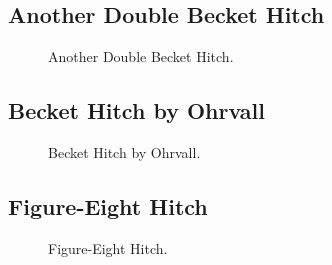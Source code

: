 
\subsection{Another Double Becket Hitch}


\begin{figure}[H]\centering
\end{figure}
\begin{figure}[H]\centering
	\caption{Another Double Becket Hitch.}\label{ris:Another_Double_Becket_Hitch}
\end{figure}

\subsection{Becket Hitch by Ohrvall}

\begin{figure}[H]\centering
	\begin{minipage}{1\linewidth}
		\begin{center}
			\tcbox[enhanced jigsaw,colframe=black,opacityframe=0.5,opacityback=0.5]
			{\centering{}}
		\end{center}
	\end{minipage}
\caption{Becket Hitch by Ohrvall.}
\label{ris:Becket_Hitch_by_Ohrvall}
\end{figure}

\subsection{Figure-Eight Hitch}

\begin{figure}[H]\centering
	\begin{minipage}{1\linewidth}
		\begin{center}
			\tcbox[enhanced jigsaw,colframe=black,opacityframe=0.5,opacityback=0.5]
			{\centering{}}
		\end{center}
	\end{minipage}
\caption{Figure-Eight Hitch.}
\label{ris:Figure-Eight_Hitch_hook}
\end{figure}


